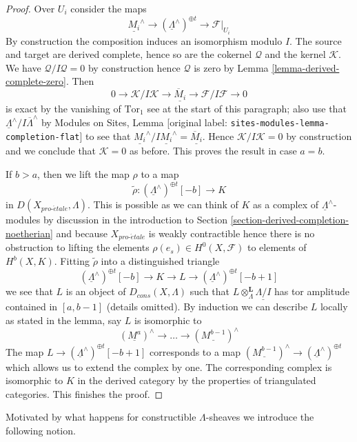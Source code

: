 \documentclass[10pt,a4paper]{article}
\theoremstyle{plain}
\theoremstyle{definition}
\theoremstyle{remark}
\numberwithin{equation}{subsection}
\def\proetale{{pro\text{-}\acute{e}tale}}
\begin{document}
\begin{proof}
Over $U_i$ consider the maps
$$
\underline{M_i}^\wedge \to
(\underline{\Lambda}^\wedge)^{\oplus t} \to
\mathcal{F}|_{U_i}
$$
By construction the composition induces an isomorphism modulo $I$.
The source and target are derived complete, hence so are the cokernel
$\mathcal{Q}$ and the kernel $\mathcal{K}$. We have
$\mathcal{Q}/I\mathcal{Q} = 0$ by construction hence $\mathcal{Q}$
is zero by Lemma \ref{lemma-derived-complete-zero}.
Then
$$
0 \to \mathcal{K}/I\mathcal{K} \to
\underline{\overline{M}_i}
\to \mathcal{F}/I\mathcal{F} \to 0
$$
is exact by the vanishing of $\text{Tor}_1$ see at the start of this
paragraph; also use that
$\underline{\Lambda}^\wedge/I\overline{\Lambda}^\wedge$ by
Modules on Sites, Lemma \textnormal{[original label: \nolinkurl{sites-modules-lemma-completion-flat}]}
to see that
$\underline{M_i}^\wedge/I\underline{M_i}^\wedge = \underline{\overline{M}_i}$.
Hence $\mathcal{K}/I\mathcal{K} = 0$ by construction and we conclude
that $\mathcal{K} = 0$ as before. This proves the result in case $a = b$.

\medskip\noindent
If $b > a$, then we lift the map $\rho$ to a map
$$
\tilde \rho : (\underline{\Lambda}^\wedge)^{\oplus t}[-b] \longrightarrow K
$$
in $D(X_\proetale, \Lambda)$. This is possible as we can think of
$K$ as a complex of $\underline{\Lambda}^\wedge$-modules by
discussion in the introduction to
Section \ref{section-derived-completion-noetherian}
and because $X_\proetale$ is weakly contractible
hence there is no obstruction to lifting the elements
$\rho(e_s) \in H^0(X, \mathcal{F})$ to elements of $H^b(X, K)$.
Fitting $\tilde \rho$ into a distinguished triangle
$$
(\underline{\Lambda}^\wedge)^{\oplus t}[-b] \to K \to L \to
(\underline{\Lambda}^\wedge)^{\oplus t}[-b + 1]
$$
we see that $L$ is an object of $D_{cons}(X, \Lambda)$ such
that $L \otimes_\Lambda^\mathbf{L} \underline{\Lambda/I}$
has tor amplitude contained in $[a, b - 1]$ (details omitted).
By induction we can describe $L$ locally as stated in the lemma, say
$L$ is isomorphic to
$$
(\underline{M^a})^\wedge \to \ldots \to (\underline{M^{b - 1}})^\wedge
$$
The map
$L \to (\underline{\Lambda}^\wedge)^{\oplus t}[-b + 1]$
corresponds to a map
$(\underline{M^{b - 1}})^\wedge \to (\underline{\Lambda}^\wedge)^{\oplus t}$
which allows us to extend the complex by one. The corresponding
complex is isomorphic to $K$ in the derived category by the properties
of triangulated categories. This finishes the proof.
\end{proof}


\noindent
Motivated by what happens for constructible $\Lambda$-sheaves
we introduce the following notion.
\end{document}
